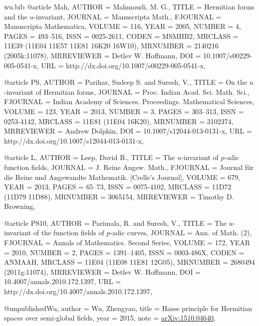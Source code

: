 \documentclass{amsart}
\numberwithin{equation}{section}
\theoremstyle{plain}
\theoremstyle{definition}
\begin{document}
\begin{filecontents}{wu.bib}
@article {Mah, 
    AUTHOR = {Mahmoudi, M. G.},
     TITLE = {Hermitian forms and the {$u$}-invariant},
   JOURNAL = {Manuscripta Math.},
  FJOURNAL = {Manuscripta Mathematica},
    VOLUME = {116},
      YEAR = {2005},
    NUMBER = {4},
     PAGES = {493--516},
      ISSN = {0025-2611},
     CODEN = {MSMHB2},
   MRCLASS = {11E39 (11E04 11E57 11E81 16K20 16W10)},
  MRNUMBER = {2140216 (2005k:11078)},
MRREVIEWER = {Detlev W. Hoffmann},
       DOI = {10.1007/s00229-005-0541-x},
       URL = {http://dx.doi.org/10.1007/s00229-005-0541-x},
}

@article {PS,
    AUTHOR = {Parihar, Sudeep S. and Suresh, V.},
     TITLE = {On the {$u$}-invariant of {H}ermitian forms},
   JOURNAL = {Proc. Indian Acad. Sci. Math. Sci.},
  FJOURNAL = {Indian Academy of Sciences. Proceedings. Mathematical
              Sciences},
    VOLUME = {123},
      YEAR = {2013},
    NUMBER = {3},
     PAGES = {303--313},
      ISSN = {0253-4142},
   MRCLASS = {11E81 (11E04 16K20)},
  MRNUMBER = {3102374},
MRREVIEWER = {Andrew Dolphin},
       DOI = {10.1007/s12044-013-0131-x},
       URL = {http://dx.doi.org/10.1007/s12044-013-0131-x},
}

@article {L, 
    AUTHOR = {Leep, David B.},
     TITLE = {The {$u$}-invariant of {$p$}-adic function fields},
   JOURNAL = {J. Reine Angew. Math.},
  FJOURNAL = {Journal f\"ur die Reine und Angewandte Mathematik. [Crelle's
              Journal]},
    VOLUME = {679},
      YEAR = {2013},
     PAGES = {65--73},
      ISSN = {0075-4102},
   MRCLASS = {11D72 (11D79 11D88)},
  MRNUMBER = {3065154},
MRREVIEWER = {Timothy D. Browning},
}

@article {PS10,
    AUTHOR = {Parimala, R. and Suresh, V.},
     TITLE = {The {$u$}-invariant of the function fields of {$p$}-adic
              curves},
   JOURNAL = {Ann. of Math. (2)},
  FJOURNAL = {Annals of Mathematics. Second Series},
    VOLUME = {172},
      YEAR = {2010},
    NUMBER = {2},
     PAGES = {1391--1405},
      ISSN = {0003-486X},
     CODEN = {ANMAAH},
   MRCLASS = {11E04 (11E08 11E81 12G05)},
  MRNUMBER = {2680494 (2011g:11074)},
MRREVIEWER = {Detlev W. Hoffmann},
       DOI = {10.4007/annals.2010.172.1397},
       URL = {http://dx.doi.org/10.4007/annals.2010.172.1397},
}

@unpublished{Wu,
	author	= {Wu, Zhengyao},
	title	= {Hasse principle for Hermitian 
	spaces over semi-global fields},
	year	= {2015},
	note	= {\href{http://arxiv.org/abs/1510.04640}{arXiv:1510.04640}},
}


\end{filecontents}
\end{document}
